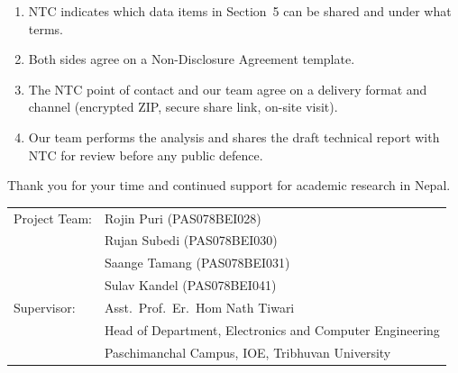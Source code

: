 \documentclass[11pt,a4paper]{article}
\begin{document}
\begin{enumerate}[leftmargin=*]
    \item NTC indicates which data items in Section~5 can be shared and
    under what terms.
    \item Both sides agree on a Non-Disclosure Agreement template.
    \item The NTC point of contact and our team agree on a delivery
    format and channel (encrypted ZIP, secure share link, on-site
    visit).
    \item Our team performs the analysis and shares the draft technical
    report with NTC for review before any public defence.
\end{enumerate}

\vspace{0.8cm}
\noindent Thank you for your time and continued support for academic
research in Nepal.

\vspace{0.8cm}
\noindent\begin{tabular}{ll}
Project Team: & Rojin Puri (PAS078BEI028)\\
              & Rujan Subedi (PAS078BEI030)\\
              & Saange Tamang (PAS078BEI031)\\
              & Sulav Kandel (PAS078BEI041)\\[0.4cm]
Supervisor:   & Asst.\ Prof.\ Er.\ Hom Nath Tiwari\\
              & Head of Department, Electronics and Computer Engineering\\
              & Paschimanchal Campus, IOE, Tribhuvan University\\
\end{tabular}
\end{document}
